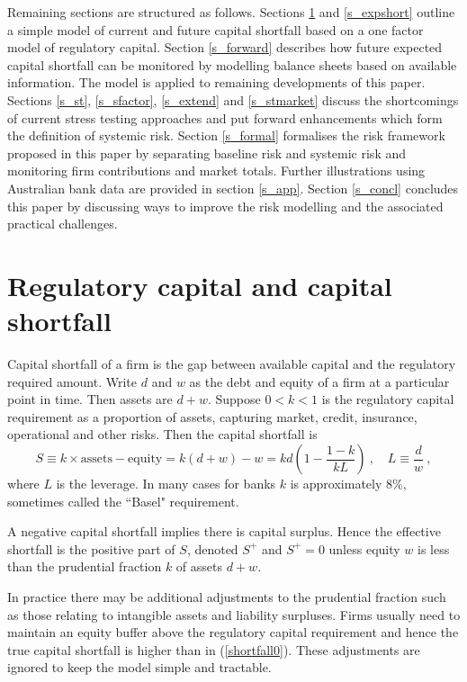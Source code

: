 \documentclass[authoryear]{elsarticle}
\newcommand{\cq}{\ ,\quad }
\newcommand{\be}[1]{\begin{equation}\label{#1}}
\newcommand{\ee}{\end{equation}}
\newcommand{\eref}[1]{(\ref{#1})}
\newcommand{\aref}[1]{\ref{#1}}
\begin{document}
Remaining sections are structured as follows. Sections  \aref{s_capmodel} and \aref{s_expshort} outline a simple model of current and future capital shortfall based on a one factor model of regulatory capital. Section \aref{s_forward} describes how future expected capital shortfall can be monitored by modelling balance sheets based on available information. The model is applied to remaining developments of this paper. Sections \aref{s_st}, \aref{s_sfactor}, \aref{s_extend} and \aref{s_stmarket}  discuss the shortcomings of current stress testing approaches and put forward enhancements which form the definition of systemic risk. Section \aref{s_formal} formalises the risk framework proposed in this paper by separating baseline risk and systemic risk and monitoring firm contributions and market totals. Further illustrations using Australian bank data are provided in section \aref{s_app}. Section \aref{s_concl} concludes this paper by discussing ways to improve the risk modelling and the associated practical challenges.


\section{Regulatory capital and capital shortfall}\label{s_capmodel}


Capital shortfall of a firm is the gap between available capital and the regulatory required amount. Write $d$ and $w$ as the debt and equity of a firm at a particular point in time. Then assets are $d+w$. Suppose $0<k<1$ is the regulatory capital requirement as a proportion of assets, capturing market, credit, insurance, operational and other risks.   Then the capital shortfall is
\be{shortfall0}
 S\equiv k\times\mathrm{assets} - \mathrm{equity} = k (d+w)-w = k d\left(1-\frac{1-k}{kL}\right)\cq L\equiv \frac{d}{w} \ ,
\ee
where $L$ is the leverage.  In many cases for banks $k$  is approximately 8\%, sometimes called the ``Basel" requirement.

A negative capital shortfall implies  there is capital surplus.   Hence the effective shortfall is  the positive part of $S$, denoted $S^+$ and  $S^+=0$  unless equity $w$ is less than the prudential fraction $k$ of assets $d+w$.

In practice there  may be additional adjustments to the prudential fraction such as those relating to intangible assets and liability surpluses. Firms usually need to maintain an equity buffer above the regulatory capital requirement and hence the true capital shortfall is higher than in \eref{shortfall0}. These adjustments are ignored to keep the model simple and tractable.
\end{document}
